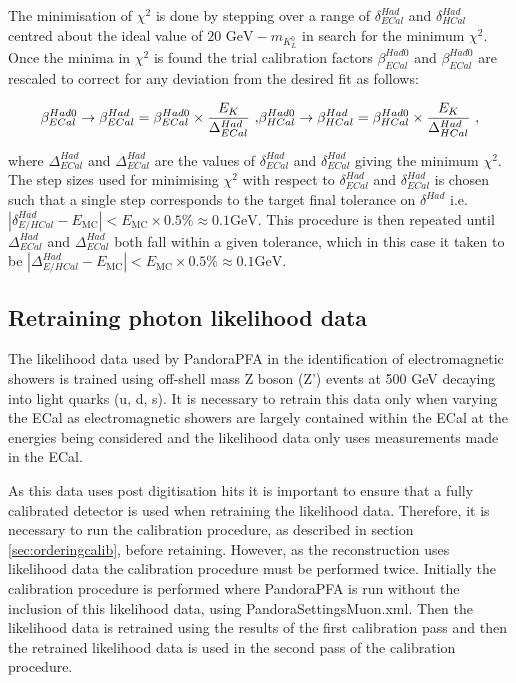 The minimisation of $\chi^{2}$ is done by stepping over a range of $\delta^{Had}_{ECal}$ and $\delta^{Had}_{HCal}$ centred about the ideal value of $20 \text { GeV} - m_{K^{0}_{L}}$ in search for the minimum $\chi^{2}$.  Once the minima in $\chi^{2}$ is found the trial calibration factors $\beta^{Had0}_{ECal}$ and $\beta^{Had0}_{ECal}$ are rescaled to correct for any deviation from the desired fit as follows:

\begin{equation}
\beta^{Had0}_{ECal} \rightarrow \beta^{Had}_{ECal} = \beta^{Had0}_{ECal} \times \frac{E_{K}}{\Delta^{Had}_{ECal}} \text{ ,}\\
\beta^{Had0}_{HCal} \rightarrow \beta^{Had}_{HCal} = \beta^{Had0}_{HCal} \times \frac{E_{K}}{\Delta^{Had}_{HCal}}\text{ ,}
\end{equation}

\noindent where $\Delta^{Had}_{ECal}$ and $\Delta^{Had}_{ECal}$ are the values of $\delta^{Had}_{ECal}$ and $\delta^{Had}_{ECal}$ giving the minimum $\chi^{2}$.  The step sizes used for minimising $\chi^{2}$ with respect to $\delta^{Had}_{ECal}$ and $\delta^{Had}_{ECal}$ is chosen such that a single step corresponds to the target final tolerance on $\delta^{Had}$ i.e. $|\delta^{Had}_{E/HCal} - E_{\text{MC}}| < E_{\text{MC}} \times 0.5 \% \approx 0.1 \text{GeV}$.  This procedure is then repeated until $\Delta^{Had}_{ECal}$ and $\Delta^{Had}_{ECal}$ both fall within a given tolerance, which in this case it taken to be $|\Delta^{Had}_{E/HCal} - E_{\text{MC}}| < E_{\text{MC}} \times 0.5 \% \approx 0.1 \text{GeV}$.


\subsection{Retraining photon likelihood data}
The likelihood data used by PandoraPFA in the identification of electromagnetic showers is trained using off-shell mass Z boson (Z') events at 500 GeV decaying into light quarks (u, d, s).  It is necessary to retrain this data only when varying the ECal as electromagnetic showers are largely contained within the ECal at the energies being considered and the likelihood data only uses measurements made in the ECal.

As this data uses post digitisation hits it is important to ensure that a fully calibrated detector is used when retraining the likelihood data.  Therefore, it is necessary to run the calibration procedure, as described in section \ref{sec:orderingcalib}, before retaining.  However, as the reconstruction uses likelihood data the calibration procedure must be performed twice.  Initially the calibration procedure is performed where PandoraPFA is run without the inclusion of this likelihood data, using PandoraSettingsMuon.xml.  Then the likelihood data is retrained using the results of the first calibration pass and then the retrained likelihood data is used in the second pass of the calibration procedure.  

